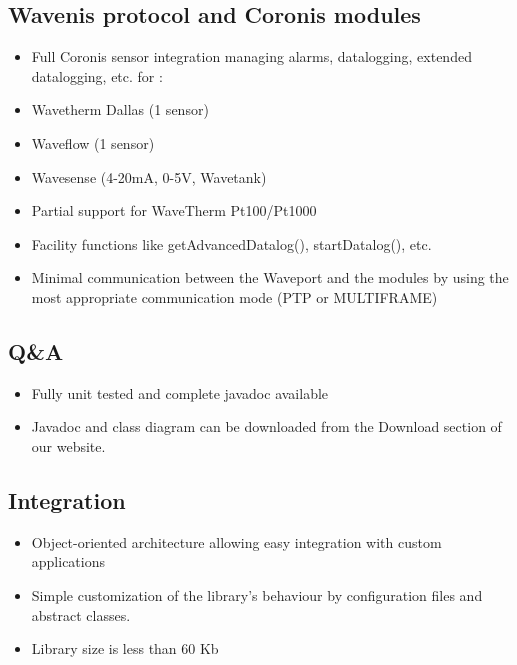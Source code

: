 \documentclass[a4paper,10pt,english]{sphinxmanual}
\begin{document}
\subsection{Wavenis protocol and Coronis modules}
\label{introduction:wavenis-protocol-and-coronis-modules}\begin{itemize}
\item {} 
Full Coronis sensor integration managing alarms, datalogging, extended datalogging, etc. for :

\end{itemize}
\begin{itemize}
\item {} 
Wavetherm Dallas (1 sensor)

\item {} 
Waveflow  (1 sensor)

\item {} 
Wavesense (4-20mA, 0-5V, Wavetank)

\end{itemize}
\begin{itemize}
\item {} 
Partial support for WaveTherm Pt100/Pt1000

\item {} 
Facility functions like getAdvancedDatalog(), startDatalog(), etc.

\item {} 
Minimal communication between the Waveport and the modules by using the most appropriate communication mode (PTP or MULTIFRAME)

\end{itemize}


\subsection{Q\&A}
\label{introduction:q-a}\begin{itemize}
\item {} 
Fully unit tested and complete javadoc available

\item {} 
Javadoc and class diagram can be downloaded from the Download section of our website.

\end{itemize}


\subsection{Integration}
\label{introduction:integration}\begin{itemize}
\item {} 
Object-oriented architecture allowing easy integration with custom applications

\item {} 
Simple customization of the library’s behaviour by configuration files and abstract classes.

\item {} 
Library size is less than 60 Kb

\end{itemize}
\end{document}
